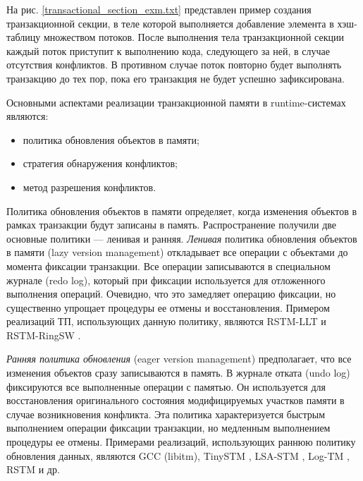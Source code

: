 На рис. \ref{transactional_section_exm.txt} представлен пример создания 
транзакционной секции, в теле которой выполняется добавление элемента в 
хэш-таблицу множеством потоков. После выполнения тела транзакционной секции 
каждый поток приступит к выполнению кода, следующего за ней, в случае отсутствия 
конфликтов. В противном случае поток повторно будет выполнять транзакцию до тех 
пор, пока его транзакция не будет успешно зафиксирована.


Основными аспектами реализации транзакционной памяти в runtime-системах 
являются:
\begin{itemize}
\item политика обновления объектов в памяти;
\item стратегия обнаружения конфликтов;
\item метод разрешения конфликтов.
\end{itemize}

Политика обновления объектов в памяти определяет, когда изменения объектов в 
рамках транзакции будут записаны в память. Распространение получили две основные
политики --- ленивая и ранняя. \textit{Ленивая} политика обновления объектов в 
памяти (lazy version management) откладывает все операции с объектами до момента
фиксации транзакции. Все операции записываются в специальном журнале (redo log),
который при фиксации используется для отложенного выполнения операций. Очевидно,
что это замедляет операцию фиксации, но существенно упрощает процедуры ее отмены
и восстановления. Примером реализаций ТП, использующих данную политику, являются
RSTM-LLT \cite{rstm_proj} и RSTM-RingSW \cite{spear_strategy_for_cm, 
spear_ringstm}.

\textit{Ранняя политика обновления} (eager version management) предполагает, что
все изменения объектов сразу записываются в память. В журнале отката (undo log) 
фиксируются все выполненные операции с памятью. Он используется для 
восстановления оригинального состояния модифицируемых участков памяти в случае 
возникновения конфликта. Эта политика характеризуется быстрым выполнением 
операции фиксации транзакции, но медленным выполнением процедуры ее отмены. 
Примерами реализаций, использующих раннюю политику обновления данных, являются 
GCC (libitm), TinySTM \cite{felber_fetzer_marlier_riegel}, LSA-STM 
\cite{riegel_felber_fetzer}, Log-TM \cite{kevin_bobba_logtm}, RSTM 
\cite{rstm_proj} и др.
 
